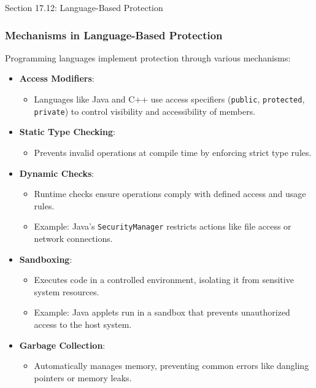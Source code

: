 \begin{notes}{Section 17.12: Language-Based Protection}
    \subsubsection*{Mechanisms in Language-Based Protection}
    
    Programming languages implement protection through various mechanisms:
    \begin{itemize}
        \item \textbf{Access Modifiers}:
        \begin{itemize}
            \item Languages like Java and C++ use access specifiers (\texttt{public}, \texttt{protected}, \texttt{private}) to control visibility and accessibility of members.
        \end{itemize}
        \item \textbf{Static Type Checking}:
        \begin{itemize}
            \item Prevents invalid operations at compile time by enforcing strict type rules.
        \end{itemize}
        \item \textbf{Dynamic Checks}:
        \begin{itemize}
            \item Runtime checks ensure operations comply with defined access and usage rules.
            \item Example: Java's \texttt{SecurityManager} restricts actions like file access or network connections.
        \end{itemize}
        \item \textbf{Sandboxing}:
        \begin{itemize}
            \item Executes code in a controlled environment, isolating it from sensitive system resources.
            \item Example: Java applets run in a sandbox that prevents unauthorized access to the host system.
        \end{itemize}
        \item \textbf{Garbage Collection}:
        \begin{itemize}
            \item Automatically manages memory, preventing common errors like dangling pointers or memory leaks.
        \end{itemize}
    \end{itemize}
    

\end{notes}
